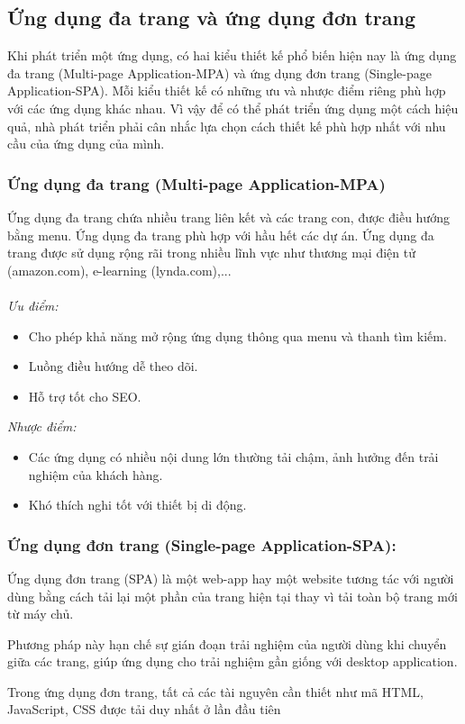 \subsection{Ứng dụng đa trang và ứng dụng đơn trang}
Khi phát triển một ứng dụng, có hai kiểu thiết kế phổ biến hiện nay là ứng dụng đa trang (Multi-page Application-MPA) và ứng dụng đơn trang (Single-page Application-SPA). Mỗi kiểu thiết kế có những ưu và nhược điểm riêng phù hợp với các ứng dụng khác nhau. Vì vậy để có thể phát triển ứng dụng một cách hiệu quả, nhà phát triển phải cân nhắc lựa chọn cách thiết kế phù hợp nhất với nhu cầu của ứng dụng của mình.
\subsubsection{Ứng dụng đa trang (Multi-page Application-MPA)}
Ứng dụng đa trang chứa nhiều trang liên kết và các trang con, được điều hướng bằng menu. Ứng dụng đa trang phù hợp với hầu hết các dự án. Ứng dụng đa trang được sử dụng rộng rãi trong nhiều lĩnh vực như thương mại điện tử (amazon.com), e-learning (lynda.com),...\\\\\textit{Ưu điểm:}
\begin{itemize}
    \item Cho phép khả năng mở rộng ứng dụng thông qua menu và thanh tìm kiếm.
    \item Luồng điều hướng dễ theo dõi. 
    \item Hỗ trợ tốt cho SEO.
\end {itemize}
\textit{Nhược điểm:}
\begin{itemize}
    \item Các ứng dụng có nhiều nội dung lớn thường tải chậm, ảnh hưởng đến trải nghiệm của khách hàng.
    \item Khó thích nghi tốt với thiết bị di động.
\end {itemize}
\subsubsection{Ứng dụng đơn trang (Single-page Application-SPA):}
Ứng dụng đơn trang (SPA) là một web-app hay một website tương tác với người dùng bằng cách tải lại một phần của trang hiện tại thay vì tải toàn bộ trang mới từ máy chủ. 

Phương pháp này hạn chế sự gián đoạn trải nghiệm của người dùng khi chuyển giữa các trang, giúp ứng dụng cho trải nghiệm gần giống với desktop application.

Trong ứng dụng đơn trang, tất cả các tài nguyên cần thiết như mã HTML, JavaScript, CSS được tải duy nhất ở lần đầu tiên 


